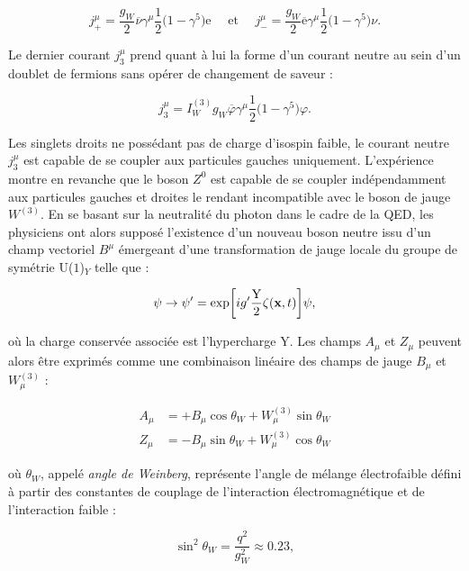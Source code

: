     \begin{equation*}
    \boxed{
        j^\mu_+ = \frac{g_W}{2}\overline{\nu}\gamma^{\mu}\frac{1}{2}\bigl(1-\gamma^5\bigr)\mbox{e} \quad \mbox{ et } \quad j^\mu_- = \frac{g_W}{2}\overline{\mbox{e}}\gamma^{\mu}\frac{1}{2}\bigl(1-\gamma^5\bigr)\nu.
    }
    \end{equation*}

    Le dernier courant $j^\mu_3$ prend quant à lui la forme d'un courant neutre au sein d'un doublet de fermions sans opérer de changement de saveur :

    $$\boxed{j^\mu_3=I^{(3)}_Wg_W\overline{\varphi}\gamma^\mu\frac{1}{2}\bigl(1-\gamma^5\bigr)\varphi.}$$

    Les singlets droits ne possédant pas de charge d'isospin faible, le courant neutre $j^\mu_3$ est capable de se coupler aux particules gauches uniquement. L'expérience montre en revanche que le boson $Z^0$ est capable de se coupler indépendamment aux particules gauches et droites le rendant incompatible avec le boson de jauge $W^{(3)}$. En se basant sur la neutralité du photon dans le cadre de la QED, les physiciens ont alors supposé l'existence d'un nouveau boson neutre issu d'un champ vectoriel $B^\mu$ émergeant d'une transformation de jauge locale du groupe de symétrie U($1$)$_Y$ telle que :

    \begin{equation}
        \psi\rightarrow\psi'=\exp[ig'\frac{\mbox{Y}}{2}\zeta(\vb{x},t)]\psi,
    \label{localU1Y}
    \end{equation}

    où la charge conservée associée est l'hypercharge Y. Les champs $A_\mu$ et $Z_\mu$ peuvent alors être exprimés comme une combinaison linéaire des champs de jauge $B_\mu$ et $W^{(3)}_\mu$ :

    \begin{equation}
    \begin{array}{ll}
         A_\mu & = +B_\mu\cos\theta_W+W^{(3)}_\mu\sin\theta_W \\
         Z_\mu & = -B_\mu\sin\theta_W+W^{(3)}_\mu\cos\theta_W
    \end{array}
    \end{equation}

    où $\theta_W$, appelé \textit{angle de Weinberg}, représente l'angle de mélange électrofaible défini à partir des constantes de couplage de l'interaction électromagnétique et de l'interaction faible :

    $$\sin^2\theta_W=\frac{q^2}{g^2_W}\approx 0.23,$$

